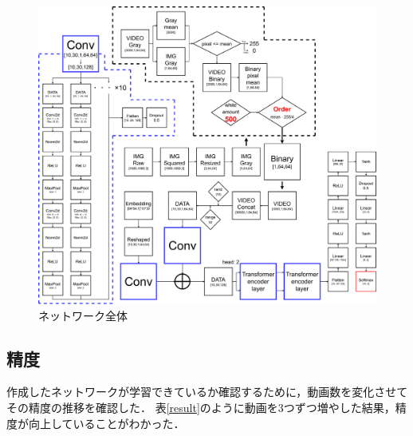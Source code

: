\begin{figure}[b]
  \begin{center}
    \includegraphics[width=130mm]{images/chart/flowchart.pdf}
  \end{center}
  \caption{ネットワーク全体}
  \label{flowchart}
\end{figure}
\clearpage

\subsection{精度}
作成したネットワークが学習できているか確認するために，動画数を変化させて
その精度の推移を確認した．
表\ref{result}のように動画を3つずつ増やした結果，精度が向上していることがわかった．

